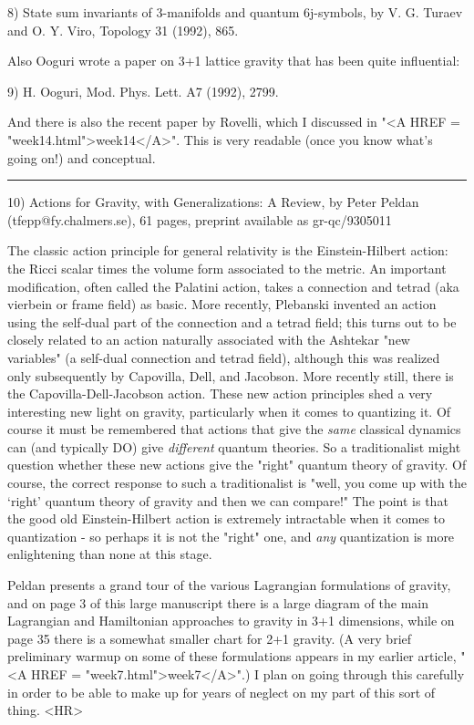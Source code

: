 8) State sum invariants of 3-manifolds and quantum 6j-symbols, by V. G. Turaev
and O. Y. Viro, Topology 31 (1992), 865. 
 
Also Ooguri wrote a paper on 3+1 lattice gravity that has been quite
influential: 
 
9) H. Ooguri, Mod. Phys. Lett. A7 (1992), 2799.

And there is also the recent paper by Rovelli, which I discussed in
"<A HREF = "week14.html">week14</A>".  This is very readable (once you know what's going on!) and
conceptual.

\par\noindent\rule{\textwidth}{0.4pt}

10)  Actions for Gravity, with Generalizations: A Review, by Peter
Peldan (tfepp@fy.chalmers.se), 61 pages, preprint available as gr-qc/9305011

The classic action principle for general relativity is the
Einstein-Hilbert action: the Ricci scalar times the volume form
associated to the metric.  An important modification, often called the
Palatini action, takes a connection and tetrad (aka vierbein or frame
field) as basic.  More recently, Plebanski invented an action using the
self-dual part of the connection and a tetrad field; this turns out to
be closely related to an action naturally associated with the Ashtekar
"new variables" (a self-dual connection and tetrad field), although this
was realized only subsequently by Capovilla, Dell, and Jacobson.  More
recently still, there is the Capovilla-Dell-Jacobson action.  These new
action principles shed a very interesting new light on gravity, particularly
when it comes to quantizing it.  Of course it must be remembered that
actions that give the \emph{same} classical dynamics can (and typically DO)
give \emph{different} quantum theories.  So a traditionalist might question
whether these new actions give the "right" quantum theory of gravity.
Of course, the correct response to such a traditionalist is "well, you
come up with the `right' quantum theory of gravity and then we can
compare!"  The point is that the good old Einstein-Hilbert action is
extremely intractable when it comes to quantization - so perhaps it is
not the "right" one, and \emph{any} quantization is more enlightening than
none at this stage.  

Peldan presents a grand tour of the various Lagrangian formulations of
gravity, and on page 3 of this large manuscript there is a large diagram
of the main Lagrangian and Hamiltonian approaches to gravity in 3+1
dimensions, while on page 35 there is a somewhat smaller chart for 2+1
gravity.  (A very brief preliminary warmup on some of these formulations
appears in my earlier article, "<A HREF = "week7.html">week7</A>".)  I plan on going through this
carefully in order to be able to make up for years of neglect on my part
of this sort of thing.
<HR>



